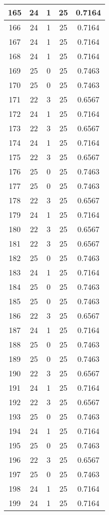 \documentclass[letterpaper, 12pt]{article}
\begin{document}
\begin{longtable}{|c|c|c|c|c|}
\hline
165 & 24 & 1 & 25 & 0.7164 \\
\hline
166 & 24 & 1 & 25 & 0.7164 \\
\hline
167 & 24 & 1 & 25 & 0.7164 \\
\hline
168 & 24 & 1 & 25 & 0.7164 \\
\hline
169 & 25 & 0 & 25 & 0.7463 \\
\hline
170 & 25 & 0 & 25 & 0.7463 \\
\hline
171 & 22 & 3 & 25 & 0.6567 \\
\hline
172 & 24 & 1 & 25 & 0.7164 \\
\hline
173 & 22 & 3 & 25 & 0.6567 \\
\hline
174 & 24 & 1 & 25 & 0.7164 \\
\hline
175 & 22 & 3 & 25 & 0.6567 \\
\hline
176 & 25 & 0 & 25 & 0.7463 \\
\hline
177 & 25 & 0 & 25 & 0.7463 \\
\hline
178 & 22 & 3 & 25 & 0.6567 \\
\hline
179 & 24 & 1 & 25 & 0.7164 \\
\hline
180 & 22 & 3 & 25 & 0.6567 \\
\hline
181 & 22 & 3 & 25 & 0.6567 \\
\hline
182 & 25 & 0 & 25 & 0.7463 \\
\hline
183 & 24 & 1 & 25 & 0.7164 \\
\hline
184 & 25 & 0 & 25 & 0.7463 \\
\hline
185 & 25 & 0 & 25 & 0.7463 \\
\hline
186 & 22 & 3 & 25 & 0.6567 \\
\hline
187 & 24 & 1 & 25 & 0.7164 \\
\hline
188 & 25 & 0 & 25 & 0.7463 \\
\hline
189 & 25 & 0 & 25 & 0.7463 \\
\hline
190 & 22 & 3 & 25 & 0.6567 \\
\hline
191 & 24 & 1 & 25 & 0.7164 \\
\hline
192 & 22 & 3 & 25 & 0.6567 \\
\hline
193 & 25 & 0 & 25 & 0.7463 \\
\hline
194 & 24 & 1 & 25 & 0.7164 \\
\hline
195 & 25 & 0 & 25 & 0.7463 \\
\hline
196 & 22 & 3 & 25 & 0.6567 \\
\hline
197 & 25 & 0 & 25 & 0.7463 \\
\hline
198 & 24 & 1 & 25 & 0.7164 \\
\hline
199 & 24 & 1 & 25 & 0.7164 \\
\hline
\end{longtable}
\end{document}
